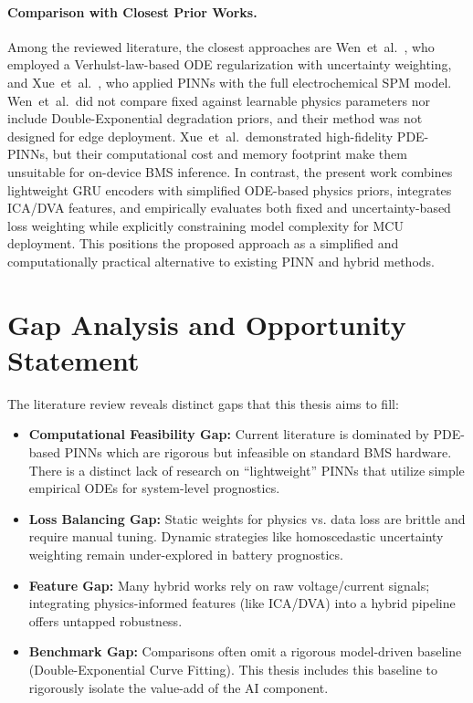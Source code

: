 \paragraph{Comparison with Closest Prior Works.}
Among the reviewed literature, the closest approaches are Wen~et~al.~\cite{pde_pinn}, who employed a Verhulst-law-based ODE regularization with uncertainty weighting, and Xue~et~al.~\cite{wang_pinn}, who applied PINNs with the full electrochemical SPM model. Wen~et~al.\ did not compare fixed against learnable physics parameters nor include Double-Exponential degradation priors, and their method was not designed for edge deployment. Xue~et~al.\ demonstrated high-fidelity PDE-PINNs, but their computational cost and memory footprint make them unsuitable for on-device BMS inference. In contrast, the present work combines lightweight GRU encoders with simplified ODE-based physics priors, integrates ICA/DVA features, and empirically evaluates both fixed and uncertainty-based loss weighting while explicitly constraining model complexity for MCU deployment. This positions the proposed approach as a simplified and computationally practical alternative to existing PINN and hybrid methods.


\section{Gap Analysis and Opportunity Statement}

The literature review reveals distinct gaps that this thesis aims to fill:

\begin{itemize}
    \item \textbf{Computational Feasibility Gap:} Current literature is dominated by PDE-based PINNs which are rigorous but infeasible on standard BMS hardware. There is a distinct lack of research on ``lightweight'' PINNs that utilize simple empirical ODEs for system-level prognostics.
    \item \textbf{Loss Balancing Gap:} Static weights for physics vs. data loss are brittle and require manual tuning. Dynamic strategies like homoscedastic uncertainty weighting remain under-explored in battery prognostics.
    \item \textbf{Feature Gap:} Many hybrid works rely on raw voltage/current signals; integrating physics-informed features (like ICA/DVA) into a hybrid pipeline offers untapped robustness.
    \item \textbf{Benchmark Gap:} Comparisons often omit a rigorous model-driven baseline (Double-Exponential Curve Fitting). This thesis includes this baseline to rigorously isolate the value-add of the AI component.
\end{itemize}